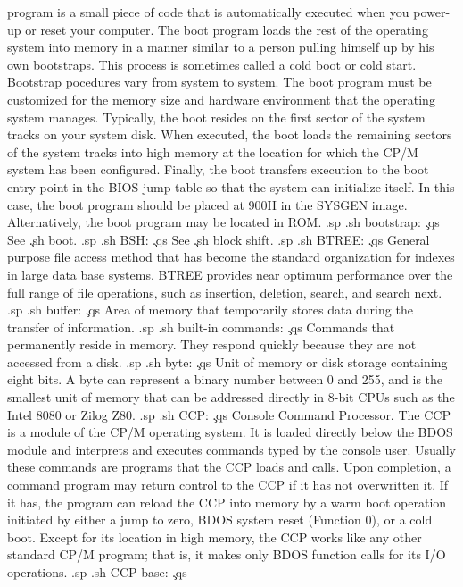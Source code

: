 program is a small piece of code that is automatically executed 
when you power-up or reset your computer.  The boot program loads 
the rest of the operating system into memory in a manner similar 
to a person pulling himself up by his own bootstraps.  This 
process is sometimes called a cold boot or cold start.  Bootstrap 
pocedures vary from system to system.  The boot program must be 
customized for the memory size and hardware environment that the 
operating system manages.  Typically, the boot resides on the 
first sector of the system tracks on your system disk.  When 
executed, the boot loads the remaining sectors of the system 
tracks into high memory at the location for which the CP/M system 
has been configured.  Finally, the boot transfers execution to 
the boot entry point in the BIOS jump table so that the system 
can initialize itself.  In this case, the boot program should be 
placed at 900H in the SYSGEN image.  Alternatively, the boot 
program may be located in ROM.
.sp
.sh
bootstrap:  \c
.qs
See \c
.sh
boot.
.sp
.sh
BSH:  \c
.qs
See \c
.sh
block shift.
.sp
.sh
BTREE:  \c
.qs
General purpose file access method that has become the standard 
organization for indexes in large data base systems.  BTREE 
provides near optimum performance over the full range of file 
operations, such as insertion, deletion, search, and search next.
.sp
.sh
buffer:  \c
.qs
Area of memory that temporarily stores data during the transfer 
of information. 
.sp
.sh
built-in commands:  \c
.qs
Commands that permanently reside in memory.  They respond quickly 
because they are not accessed from a disk.
.sp
.sh
byte:  \c
.qs
Unit of memory or disk storage containing eight bits.  A byte can 
represent a binary number between 0 and 255, and is the smallest 
unit of memory that can be addressed directly in 8-bit CPUs such 
as the Intel 8080 or Zilog Z80.
.sp
.sh
CCP:  \c
.qs
Console Command Processor.  The CCP is a module of the CP/M 
operating system.  It is loaded directly below the BDOS module 
and interprets and executes commands typed by the console user.  
Usually these commands are programs that the CCP loads and calls.  
Upon completion, a command program may return control to the CCP 
if it has not overwritten it.  If it has, the program can reload 
the CCP into memory by a warm boot operation initiated by either 
a jump to zero, BDOS system reset (Function 0), or a cold boot.  
Except for its location in high memory, the CCP works like any 
other standard CP/M program; that is, it makes only BDOS function 
calls for its I/O operations.
.sp
.sh
CCP base:  \c
.qs
